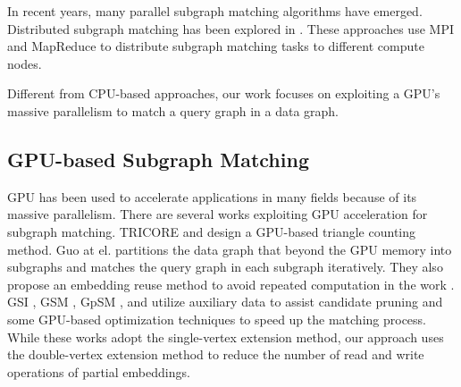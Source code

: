 In recent years, many parallel subgraph matching algorithms have emerged.  Distributed subgraph matching  has been explored in \cite{afrati2013enumerating, shao2014parallel,shi2020graphpi,talukder2016distributed,sun2018parallelizing,plantenga2013inexact,reza2018prunejuice}. These approaches use MPI and MapReduce to distribute subgraph matching tasks to different compute nodes.

Different from CPU-based approaches, our work focuses on exploiting a GPU's massive parallelism to match a query graph in a data graph.

\subsection{GPU-based Subgraph Matching}
GPU has been used to accelerate applications in many fields because of its massive parallelism. There are several works exploiting GPU acceleration for subgraph matching. TRICORE \cite{hu2018tricore}  and \cite{green2014fast} design a GPU-based triangle counting method. Guo at el. \cite{guo2020gpu} partitions the data graph that beyond the GPU memory into subgraphs and matches the query graph in each subgraph iteratively. They also propose an embedding reuse method to avoid repeated computation in the work \cite{guo2020exploiting}. GSI \cite{zeng2020gsi}, GSM \cite{wang2020fast}, GpSM \cite{tran2015fast}, and \cite{lin2016network} utilize auxiliary data to assist candidate pruning and some GPU-based optimization techniques to speed up the matching process. While these works adopt the single-vertex extension method, our approach uses the double-vertex extension method to reduce the number of read and write operations of partial embeddings.

